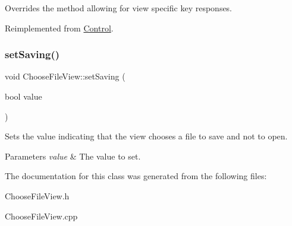 Overrides the method allowing for view specific key responses. 



Reimplemented from \mbox{\hyperlink{class_control_a4731a62a9ea0510d51924509ae74c93e}{Control}}.

\mbox{\label{class_choose_file_view_a029ba814f5f89c87f09dc23d61c936a6}} 
\subsubsection{\texorpdfstring{setSaving()}{setSaving()}}
{\footnotesize\ttfamily void Choose\+File\+View\+::set\+Saving (\begin{DoxyParamCaption}\item[{bool}]{value }\end{DoxyParamCaption})}



Sets the value indicating that the view chooses a file to save and not to open. 


\begin{DoxyParams}{Parameters}
{\em value} & The value to set.\\
\hline
\end{DoxyParams}


The documentation for this class was generated from the following files\+:\begin{DoxyCompactItemize}
\item 
Choose\+File\+View.\+h\item 
Choose\+File\+View.\+cpp\end{DoxyCompactItemize}
